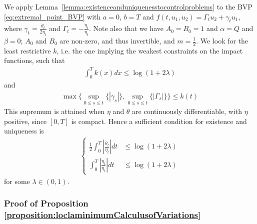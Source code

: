 \documentclass[final,3p,authoryear,12pt]{elsarticle}
\begin{document}
We apply Lemma~\ref{lemma:existenceanduniquenesstocontrolproblems} to the BVP
\eqref{eq:extremal_point_BVP} with $a=0$, $b=T$ and
$f(t,u_{1},u_{2}) = \Gamma_{t}u_{2} + \gamma_{t}u_{1}$, where
$\gamma_{t}=\frac{\dot \theta_{t}}{2\eta_{t}}$ and
$\Gamma_{t} = -\frac{\dot \eta_{t}}{\eta_{t}}$.
Note also that we have $A_0=B_0=1$ and $\alpha=Q$ and $\beta=0$; $A_0$ and $B_0$
are non-zero, and thus invertible, and $m = \frac{1}{2}$.
We look for the least restrictive $k$, i.e. the one implying the weakest constraints on the impact functions, such that 
\begin{eqnarray}
    \int_{0}^{T}k(x)dx\le \log(1+2\lambda)
\end{eqnarray}
and 
\begin{eqnarray}
     \max\{\sup_{0\le s \le t}\{|\gamma_{s}|\},\sup_{0\le s \le t}\{|\Gamma_{s}|\}\} \le k(t)
\end{eqnarray} 
This supremum is attained when $\eta$ and $\theta$ are continuously differentiable, with $\eta$ positive, since $[0,T]$ is compact. Hence a sufficient condition for existence and uniqueness is
\begin{align}\label{eq:condition}
    \begin{cases}
        \frac{1}{2}\int_{0}^{T}\left| \frac{\dot \theta_{t}}{\eta_{t}}\right| dt &\le \log(1+2\lambda) \\ 
        \int_{0}^{T}\left| \frac{\dot \eta_{t}}{\eta_{t}}\right|dt &\le \log(1+2\lambda)
    \end{cases}
\end{align}
for some $\lambda \in (0,1)$. 

\subsubsection{Proof of Proposition \ref{proposition:loclaminimumCalculusofVariations}}
\end{document}
